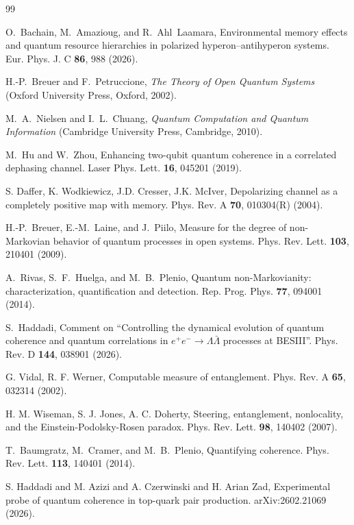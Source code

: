\documentclass[epjc,twocolumn,nofootinbib,preprintnumbers,amsmath,amssymb]{revtex4-2}
\begin{document}
\begin{thebibliography}{99}

O.~Bachain, M.~Amazioug, and R.~Ahl~Laamara,
Environmental memory effects and quantum resource hierarchies in polarized hyperon--antihyperon systems.
Eur. Phys. J. C {\bf 86}, 988 (2026).

H.-P.~Breuer and F.~Petruccione,
\textit{The Theory of Open Quantum Systems}
(Oxford University Press, Oxford, 2002).

M.~A.~Nielsen and I.~L.~Chuang,
\textit{Quantum Computation and Quantum Information}
(Cambridge University Press, Cambridge, 2010).

M.~Hu and W.~Zhou,
Enhancing two-qubit quantum coherence in a correlated dephasing channel.
Laser Phys. Lett. \textbf{16}, 045201 (2019).

S. Daffer, K. Wodkiewicz, J.D. Cresser, J.K. McIver,
Depolarizing channel as a completely positive map with memory. Phys.
Rev. A \textbf{70}, 010304(R) (2004).


H.-P.~Breuer, E.-M.~Laine, and J.~Piilo,
Measure for the degree of non-Markovian behavior of quantum processes in open systems.
Phys. Rev. Lett. \textbf{103}, 210401 (2009).

A.~Rivas, S.~F.~Huelga, and M.~B.~Plenio,
Quantum non-Markovianity: characterization, quantification and detection.
Rep. Prog. Phys. \textbf{77}, 094001 (2014).

S.~Haddadi,
Comment on ``Controlling the dynamical evolution of quantum coherence and quantum correlations in $e^+e^-\rightarrow\Lambda\bar\Lambda$ processes at BESIII''.
Phys. Rev. D \textbf{144}, 038901 (2026).


G. Vidal, R. F. Werner, Computable measure of entanglement.
Phys. Rev. A \textbf{65}, 032314 (2002).

H. M. Wiseman, S. J. Jones, A. C. Doherty,
Steering, entanglement, nonlocality, and the Einstein-Podolsky-Rosen paradox.
Phys. Rev. Lett. \textbf{98}, 140402 (2007).


T.~Baumgratz, M.~Cramer, and M.~B.~Plenio,
Quantifying coherence.
Phys. Rev. Lett. \textbf{113}, 140401 (2014).

S. Haddadi and M. Azizi and A. Czerwinski and H. Arian Zad,
Experimental probe of quantum coherence in top-quark pair production.
 arXiv:2602.21069 (2026).



\end{thebibliography}

\end{document}
